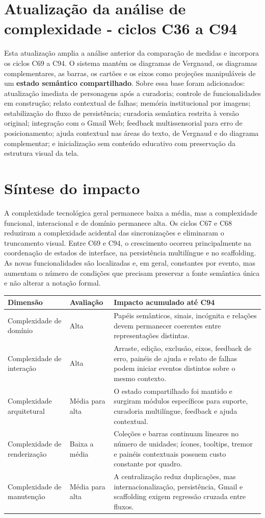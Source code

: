 \documentclass[12pt,a4paper]{article}
\begin{document}
\section*{Atualização da análise de complexidade - ciclos C36 a C94}

Esta atualização amplia a análise anterior da comparação de medidas e incorpora os ciclos C69 a C94. O sistema mantém os diagramas de Vergnaud, os diagramas complementares, as barras, os cartões e os eixos como projeções manipuláveis de um \textbf{estado semântico compartilhado}. Sobre essa base foram adicionados: atualização imediata de personagens após a curadoria; controle de funcionalidades em construção; relato contextual de falhas; memória institucional por imagens; estabilização do fluxo de persistência; curadoria semântica restrita à versão original; integração com o Gmail Web; feedback multissensorial para erro de posicionamento; ajuda contextual nas áreas do texto, de Vergnaud e do diagrama complementar; e inicialização sem conteúdo educativo com preservação da estrutura visual da tela.

\section{Síntese do impacto}

A complexidade tecnológica geral permanece baixa a média, mas a complexidade funcional, interacional e de domínio permanece alta. Os ciclos C67 e C68 reduziram a complexidade acidental das sincronizações e eliminaram o truncamento visual. Entre C69 e C94, o crescimento ocorreu principalmente na coordenação de estados de interface, na persistência multilíngue e no scaffolding. As novas funcionalidades são localizadas e, em geral, constantes por evento, mas aumentam o número de condições que precisam preservar a fonte semântica única e não alterar a notação formal.

\begin{tabularx}{\textwidth}{p{3.8cm}p{2.8cm}X}
\toprule
\textbf{Dimensão} & \textbf{Avaliação} & \textbf{Impacto acumulado até C94}\\
\midrule
Complexidade de domínio & Alta & Papéis semânticos, sinais, incógnita e relações devem permanecer coerentes entre representações distintas.\\
Complexidade de interação & Alta & Arraste, edição, exclusão, eixos, feedback de erro, painéis de ajuda e relato de falhas podem iniciar eventos distintos sobre o mesmo contexto.\\
Complexidade arquitetural & Média para alta & O estado compartilhado foi mantido e surgiram módulos específicos para suporte, curadoria multilíngue, feedback e ajuda contextual.\\
Complexidade de renderização & Baixa a média & Coleções e barras continuam lineares no número de unidades; ícones, tooltips, tremor e painéis contextuais possuem custo constante por quadro.\\
Complexidade de manutenção & Média para alta & A centralização reduz duplicações, mas internacionalização, persistência, Gmail e scaffolding exigem regressão cruzada entre fluxos.\\
\bottomrule
\end{tabularx}
\end{document}
